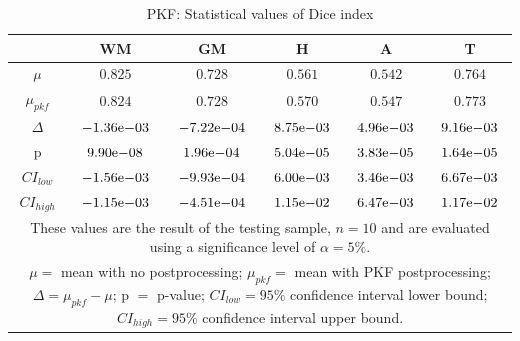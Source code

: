 \documentclass[journal]{IEEEtran}
\begin{document}
\begin{table}[ht]
\renewcommand{\arraystretch}{1.4}
\caption{PKF: Statistical values of Dice index}
\label{tbl_pkf_dice}
\centering
\tabcolsep=0.11cm
\begin{tabular}{c|c|c|c|c|c}
\hline
 & WM & GM & H & A & T\\
\hline
$\mu$&$0.825$&$0.728$&$0.561$&$0.542$&$0.764$\\
$\mu_{pkf}$&$0.824$&$0.728$&$0.570$&$0.547$&$0.773$\\
$\Delta$&${-1.36}\mathrm{e}{-03}$&${-7.22}\mathrm{e}{-04}$&${8.75}\mathrm{e}{-03}$&${4.96}\mathrm{e}{-03}$&$9{.16}\mathrm{e}{-03}$\\
p&$	{9.90}\mathrm{e}{-08}$&${1.96}\mathrm{e}{-04}$&${5.04}\mathrm{e}{-05}$&$	{3.83}\mathrm{e}{-05}$&${1.64}\mathrm{e}{-05}$\\
$CI_{low}$&${-1.56}\mathrm{e}{-03}$&${-9.93}\mathrm{e}{-04}$&${6.00}\mathrm{e}{-03}$&$	{3.46}\mathrm{e}{-03}$&${6.67}\mathrm{e}{-03}$\\
$CI_{high}$&$	{-1.15}\mathrm{e}{-03}$&${-4.51}\mathrm{e}{-04}$&${1.15}\mathrm{e}{-02}$&$	{6.47}\mathrm{e}{-03}$&${1.17}\mathrm{e}{-02}$\\
\hline
\multicolumn{6}{p{3.4in}}{These values are the result of the testing sample, $n=10$ and are evaluated using a significance level of $\alpha = 5\%$. }\\
\multicolumn{6}{p{3.4in}}{$\mu=$ mean with no postprocessing; $\mu_{pkf}=$ mean with PKF postprocessing; $\Delta=\mu_{pkf}-\mu$; p $=$ p-value;  $CI_{low}= 95\%$ confidence interval lower bound; $CI_{high}= 95\%$ confidence interval upper bound.}\\

\end{tabular}
\end{table}
\end{document}
